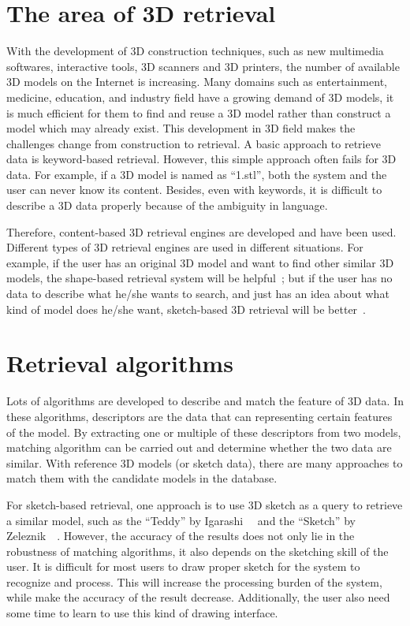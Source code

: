 \section{The area of 3D retrieval} \label{sec:3dretrieval}

With the development of 3D construction techniques, such as new multimedia softwares, interactive tools, 3D scanners and 3D printers, the number of available 3D models on the Internet is increasing. Many domains such as entertainment, medicine, education, and industry field have a growing demand of 3D models, it is much efficient for them to find and reuse a 3D model rather than construct a model which may already exist. This development in 3D field makes the challenges change from construction to retrieval. A basic approach to retrieve data is keyword-based retrieval. However, this simple approach often fails for 3D data. For example, if a 3D model is named as ``1.stl'', both the system and the user can never know its content. Besides, even with keywords, it is difficult to describe a 3D data properly because of the ambiguity in language. 

Therefore, content-based 3D retrieval engines are developed and have been used. Different types of 3D retrieval engines are used in different situations. For example, if the user has an original 3D model and want to find other similar 3D models, the shape-based retrieval system will be helpful~\cite{Funkhouser:2003:SEM:588272.588279}; but if the user has no data to describe what he/she wants to search, and just has an idea about what kind of model does he/she want, sketch-based 3D retrieval will be better~\cite{CGF:CGF12200}. 

\section{Retrieval algorithms} \label{sec:retrievalalgorithms}

Lots of algorithms are developed to describe and match the feature of 3D data. In these algorithms, descriptors are the data that can representing certain features of the model. By extracting one or multiple of these descriptors from two models, matching algorithm can be carried out and determine whether the two data are similar. With reference 3D models (or sketch data), there are many approaches to match them with the candidate models in the database. 

For sketch-based retrieval, one approach is to use 3D sketch as a query to retrieve a similar model, such as the ``Teddy'' by Igarashi~\etal~\cite{Igarashi:2007:TSI:1281500.1281532} and the ``Sketch'' by Zeleznik~\etal~\cite{Zeleznik:2007:SIS:1281500.1281530}. However, the accuracy of the results does not only lie in the robustness of matching algorithms, it also depends on the sketching skill of the user. It is difficult for most users to draw proper sketch for the system to recognize and process. This will increase the processing burden of the system, while make the accuracy of the result decrease. Additionally, the user also need some time to learn to use this kind of drawing interface. 

